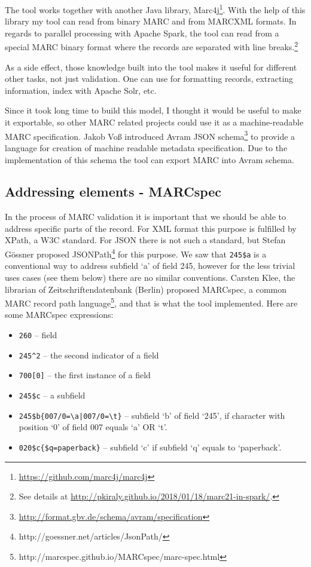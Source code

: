 The tool works together with another Java library, Marc4j\footnote{\url{https://github.com/marc4j/marc4j}}. With the help of this library my tool can read from binary MARC and from MARCXML formats. In regards to parallel processing with Apache Spark, the tool can read from a special MARC binary format where the records are separated with line breaks.\footnote{See details at \url{http://pkiraly.github.io/2018/01/18/marc21-in-spark/}.}

As a side effect, those knowledge built into the tool makes it useful for different other tasks, not just validation. One can use for formatting records, extracting information, index with Apache Solr, etc.

Since it took long time to build this model, I thought it would be useful to make it exportable, so other MARC related projects could use it as a machine-readable MARC specification. Jakob Voß introduced Avram JSON schema\footnote{\url{http://format.gbv.de/schema/avram/specification}} to provide a language for creation of machine readable metadata specification. Due to the implementation of this schema the tool can export MARC into Avram schema.  

\subsection{Addressing elements - MARCspec}

In the process of MARC validation it is important that we should be able to address specific parts of the record. For XML format this purpose is fulfilled by XPath, a W3C standard. For JSON there is not such a standard, but Stefan Gössner proposed JSONPath\footnote{http://goessner.net/articles/JsonPath/} for this purpose. We saw that \verb|245$a| is a conventional way to address subfield `a' of field 245, however for the less trivial uses cases (see them below) there are no similar conventions. Carsten Klee, the librarian of Zeitschriftendatenbank (Berlin) proposed MARCspec, a common MARC record path language\footnote{http://marcspec.github.io/MARCspec/marc-spec.html}, and that is what the tool implemented. Here are some MARCspec expressions:

\begin{itemize}
 \setlength{\parskip}{0pt}
 \setlength{\itemsep}{0pt plus 1pt}
  \item \verb|260| -- field
  \item \verb|245^2| -- the second indicator of a field
  \item \verb|700[0]| -- the first instance of a field
  \item \verb|245$c| -- a subfield
  \item \verb:245$b{007/0=\a|007/0=\t}: -- subfield ‘b’ of field ‘245’, if character with position ‘0’ of field 007 equals ‘a’ OR ‘t’.
  \item \verb|020$c{$q=paperback}| -- subfield ‘c’ if subfield ‘q’ equals to ‘paperback’.
\end{itemize}

